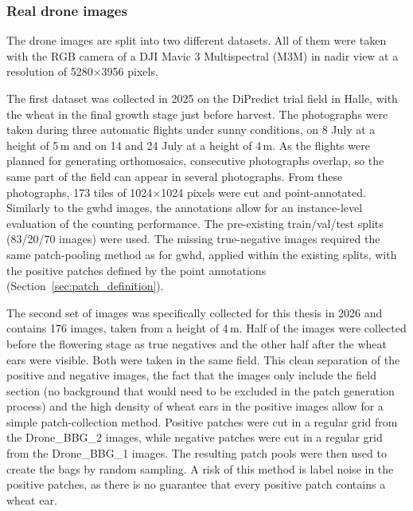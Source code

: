 \documentclass[12pt,parskip = half, DIV=classic,listof=totoc]{scrartcl}
\begin{document}
			\subsubsection{Real drone images}\label{sec:real_drone}
				The drone images are split into two different datasets. All of them were taken with the RGB camera of a 
				DJI Mavic 3 Multispectral (M3M) in nadir view at a resolution of 5280$\times$3956 pixels.

				The first dataset was collected in 2025 on the DiPredict trial field in Halle, with the wheat in the final 
				growth stage just before harvest. The photographs were taken during three automatic flights under sunny 
				conditions, on 8 July at a height of 5\,m and on 14 and 24 July at a height of 4\,m. As the flights were 
				planned for generating orthomosaics, consecutive photographs overlap, so the same part of the field can 
				appear in several photographs. From these photographs, 173 tiles of 1024$\times$1024 pixels were cut and 
				point-annotated. Similarly to the \ac{gwhd} images, the annotations allow for an instance-level evaluation 
				of the counting performance. The pre-existing train/val/test splits (83/20/70 images) were used.
				The missing true-negative images required the same patch-pooling method as for \ac{gwhd}, applied within 
				the existing splits, with the positive patches defined by the point annotations 
				(Section~\ref{sec:patch_definition}).

				The second set of images was specifically collected for this thesis in 2026 and contains 176 images, taken 
				from a height of 4\,m. Half of the images were collected before the flowering stage as true negatives and 
				the other half after the wheat ears were visible. Both were taken in the same field. This clean separation 
				of the positive and negative images, the fact that the images only include the field section (no background 
				that would need to be excluded in the patch generation process) and the high density of wheat ears in the 
				positive images allow for a simple patch-collection method. Positive patches were cut in a regular grid 
				from the Drone\_BBG\_2 images, while negative patches were cut in a regular grid from the Drone\_BBG\_1 
				images. The resulting patch pools were then used to create the bags by random sampling. A risk of this 
				method is label noise in the positive patches, as there is no guarantee that every positive patch contains 
				a wheat ear.
		
\end{document}
